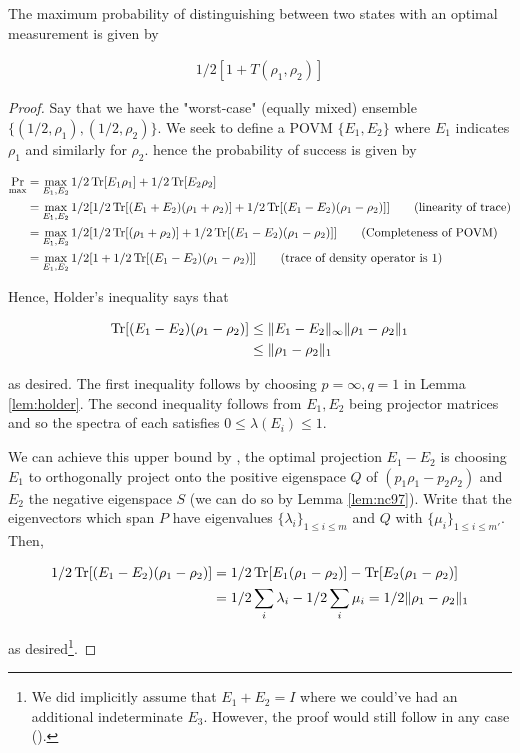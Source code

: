 \documentclass[main.tex]{subfiles}
\begin{document}
\begin{proposition}
The maximum probability of distinguishing between two states with an optimal measurement is given by

\begin{align*}
	1/2[1 + T(\rho_1, \rho_2)]
\end{align*}

\end{proposition}
\begin{proof}
Say that we have the "worst-case" (equally mixed) ensemble $\{ (1/2, \rho_1), (1/2, \rho_2)\}$. We seek to define a POVM $\{E_1, E_2 \}$ where $E_1$ indicates $\rho_1$ and similarly for $\rho_2$. hence the probability of success is given by

\begin{align*}
\Pr_{\max} &= \max_{E_1, E_2} 1/2 \Tr[E_1\rho_1] + 1/2 \Tr[E_2\rho_2] \\
&= \max_{E_1, E_2} 1/2[1/2 \Tr[(E_1+E_2)(\rho_1 + \rho_2)] + 1/2 \Tr[(E_1 - E_2)(\rho_1 - \rho_2)]] \tag{linearity of trace}\\
&= \max_{E_1, E_2} 1/2[1/2 \Tr[(\rho_1 + \rho_2)] + 1/2 \Tr[(E_1 - E_2)(\rho_1 - \rho_2)]] \tag{Completeness of POVM} \\
&= \max_{E_1, E_2} 1/2[1 + 1/2 \Tr[(E_1 - E_2)(\rho_1 - \rho_2)]] \tag{trace of density operator is 1}
\end{align*}

Hence, Holder's inequality says that

\begin{align*}
\Tr[(E_1 - E_2)(\rho_1 - \rho_2)] &\leq \|E_1 - E_2 \|_\infty \|\rho_1 - \rho_2 \|_1 \\
&\leq \|\rho_1 - \rho_2 \|_1
\end{align*}

as desired. The first inequality follows by choosing $p = \infty, q = 1$ in Lemma \ref{lem:holder}. The second inequality follows from $E_1, E_2$ being projector matrices and so the spectra of each satisfies $0 \leq \lambda(E_i) \leq 1$.

We can achieve this upper bound by , the optimal projection $E_1 - E_2$ is choosing $E_1$ to orthogonally project onto the positive eigenspace $Q$ of $(p_1\rho_1 - p_2\rho_2)$ and $E_2$ the negative eigenspace $S$ (we can do so by Lemma \ref{lem:nc97}). Write that the eigenvectors which span $P$ have eigenvalues $\{ \lambda_i \}_{1 \leq i \leq m}$ and $Q$ with $\{\mu_i \}_{1 \leq i \leq m'}$. Then,

\begin{align*}
1/2\Tr[(E_1 - E_2)(\rho_1 - \rho_2)] &= 1/2\Tr[E_1(\rho_1 - \rho_2)] - \Tr[E_2(\rho_1 - \rho_2)] \\
&= 1/2 \sum_i \lambda_i - 1/2 \sum_i \mu_i = 1/2 \| \rho_1 - \rho_2 \|_1
\end{align*}

as desired\footnote{We did implicitly assume that $E_1 + E_2 = I$ where we could've had an additional indeterminate $E_3$. However, the proof would still follow in any case (\cite{nielsen2010quantum}).}.
\end{proof}
\end{document}
